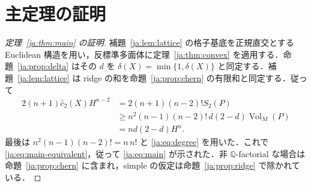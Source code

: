 \documentclass[12pt]{amsart}
\theoremstyle{definition}
\theoremstyle{remark}
\numberwithin{equation}{section}
\theoremstyle{plain}
\theoremstyle{definition}
\theoremstyle{remark}
\begin{document}
\section{主定理の証明}\label{ja:sec:main-proof}
\begin{proof}[定理~\ref{ja:thm:main} の証明]
補題~\ref{ja:lem:lattice} の格子基底を正規直交とする Euclidean 構造を用い，反標準多面体に定理~\ref{ja:thm:convex} を適用する．命題~\ref{ja:prop:delta} はその $d$ を $\delta(X)=\min\{1,\delta(X)\}$ と同定する．補題~\ref{ja:lem:lattice} は ridge の和を命題~\ref{ja:prop:chern} の有限和と同定する．従って
\begin{equation}\label{ja:eq:return}
 \begin{aligned}
 2(n+1)\widehat c_2(X)H^{n-2}
 &=2(n+1)(n-2)!S_2(P)\\
 &\ge n^2(n-1)(n-2)!\,d(2-d)\operatorname{Vol}_M(P)\\
 &=nd(2-d)H^n.
 \end{aligned}
\end{equation}
最後は $n^2(n-1)(n-2)!=n\,n!$ と \eqref{ja:eq:degree} を用いた．これで \eqref{ja:eq:main-equivalent}，従って \eqref{ja:eq:main} が示された．非 $\mathbb Q$-factorial な場合は命題~\ref{ja:prop:chern} に含まれ，simple の仮定は命題~\ref{ja:prop:ridge} で除かれている．
\end{proof}
\end{document}

